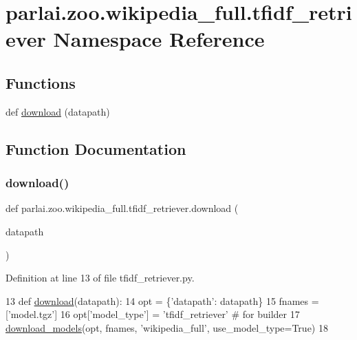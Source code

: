 \hypertarget{namespaceparlai_1_1zoo_1_1wikipedia__full_1_1tfidf__retriever}{}\section{parlai.\+zoo.\+wikipedia\+\_\+full.\+tfidf\+\_\+retriever Namespace Reference}
\label{namespaceparlai_1_1zoo_1_1wikipedia__full_1_1tfidf__retriever}
\subsection*{Functions}
\begin{DoxyCompactItemize}
\item 
def \hyperlink{namespaceparlai_1_1zoo_1_1wikipedia__full_1_1tfidf__retriever_ae4ca3b13b024e2db9313c275cfcdfac7}{download} (datapath)
\end{DoxyCompactItemize}


\subsection{Function Documentation}
\mbox{\label{namespaceparlai_1_1zoo_1_1wikipedia__full_1_1tfidf__retriever_ae4ca3b13b024e2db9313c275cfcdfac7}} 
\subsubsection{\texorpdfstring{download()}{download()}}
{\footnotesize\ttfamily def parlai.\+zoo.\+wikipedia\+\_\+full.\+tfidf\+\_\+retriever.\+download (\begin{DoxyParamCaption}\item[{}]{datapath }\end{DoxyParamCaption})}



Definition at line 13 of file tfidf\+\_\+retriever.\+py.


\begin{DoxyCode}
13 \textcolor{keyword}{def }\hyperlink{namespaceparlai_1_1zoo_1_1wikipedia__full_1_1tfidf__retriever_ae4ca3b13b024e2db9313c275cfcdfac7}{download}(datapath):
14     opt = \{\textcolor{stringliteral}{'datapath'}: datapath\}
15     fnames = [\textcolor{stringliteral}{'model.tgz'}]
16     opt[\textcolor{stringliteral}{'model\_type'}] = \textcolor{stringliteral}{'tfidf\_retriever'}  \textcolor{comment}{# for builder}
17     \hyperlink{namespaceparlai_1_1core_1_1build__data_ab697f23f05d3e36d7979fe5e0ed7911e}{download\_models}(opt, fnames, \textcolor{stringliteral}{'wikipedia\_full'}, use\_model\_type=\textcolor{keyword}{True})
18 \end{DoxyCode}
